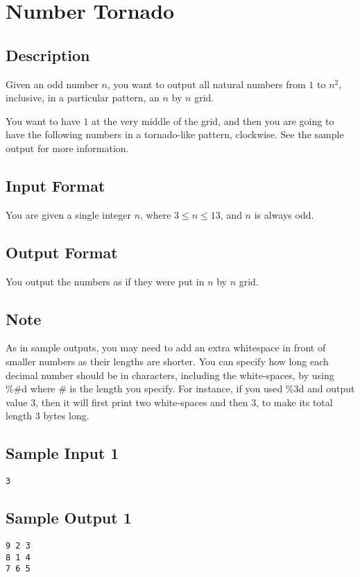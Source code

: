 \newpage


\section{Number Tornado}

\subsection*{Description}
Given an odd number $n$, you want to output all natural numbers from $1$ to $n^2$, inclusive, in a particular pattern, an $n$ by $n$ grid.
 
You want to have $1$ at the very middle of the grid, and then you are going to have the following numbers in a tornado-like pattern, clockwise.  See the sample output for more information.

\subsection*{Input Format}
You are given a single integer $n$, where $3 \leq n \leq 13$, and $n$ is always odd. 
\subsection*{Output Format}
You output the numbers as if they were put in $n$ by $n$ grid.

\subsection*{Note}
As in sample outputs, you may need to add an extra whitespace in front of smaller numbers as their lengths are shorter. 
You can specify how long each decimal number should be in characters, including the white-spaces, by using \%\#d where \# is the length you specify.
For instance, if you used \%3d and output value 3, then it will first print two white-spaces and then 3, to make its total length 3 bytes long.


\subsection*{Sample Input 1}
\begin{verbatim}
3
\end{verbatim}

\subsection*{Sample Output 1}
\begin{verbatim}
9 2 3
8 1 4
7 6 5
\end{verbatim}

